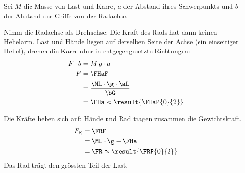 Sei $M$ die Masse von Last und Karre, $a$ der Abstand ihres Schwerpunkts und $b$ der Abstand der Griffe von der Radachse.

\begin{abcliste}
\abc
Nimm die Radachse als Drehachse: Die Kraft des Rads hat dann keinen Hebelarm. Last und Hände liegen auf derselben Seite der Achse (ein einseitiger Hebel), drehen die Karre aber in entgegengesetzte Richtungen:
\begin{align}
 F\cdot b &= M\,g\cdot a \\
 F &= \FHaF \\
   &= \frac{\ML\cdot\g\cdot\aL}{\bG} \\
   &= \FHa \approx \result{\FHaP{0}{2}}
\end{align}

\abc
Die Kräfte heben sich auf: Hände und Rad tragen zusammen die Gewichtskraft.
\begin{align}
 F_\mathrm{R} &= \FRF \\
   &= \ML\cdot\g-\FHa \\
   &= \FR \approx \result{\FRP{0}{2}}
\end{align}
Das Rad trägt den grössten Teil der Last.
\end{abcliste}
